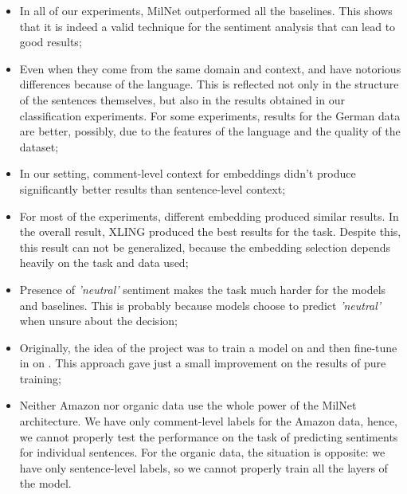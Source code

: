 \begin{itemize}
    \item In all of our experiments, MilNet outperformed all the baselines. This shows that it is indeed a valid technique for the sentiment analysis that can lead to good results;
    \item Even when they come from the same domain and context, \dataEN and \dataDE have notorious differences because of the language. This is reflected not only in the structure of the sentences themselves, but also in the results obtained in our classification experiments. For some experiments, results for the German data are better, possibly, due to the features of the language and the quality of the dataset;
    \item In our setting, comment-level context for embeddings didn't produce significantly better results than sentence-level context;
    \item For most of the experiments, different embedding produced similar results. In the overall result, XLING produced the best results for the task. Despite this, this result can not be generalized, because the embedding selection depends heavily on the task and data used;
    \item Presence of {\it 'neutral'} sentiment makes the task much harder for the models and baselines. This is probably because models choose to predict {\it 'neutral'} when unsure about the decision;
    \item Originally, the idea of the project was to train a model on \dataEN and then fine-tune in on \dataORG. This approach gave just a small improvement on the results of pure \dataORG training;
    \item Neither Amazon nor organic data use the whole power of the MilNet architecture. We have only comment-level labels for the Amazon data, hence, we cannot properly test the performance on the task of predicting sentiments for individual sentences. For the organic data, the situation is opposite: we have only sentence-level labels, so we cannot properly train all the layers of the model.
\end{itemize}